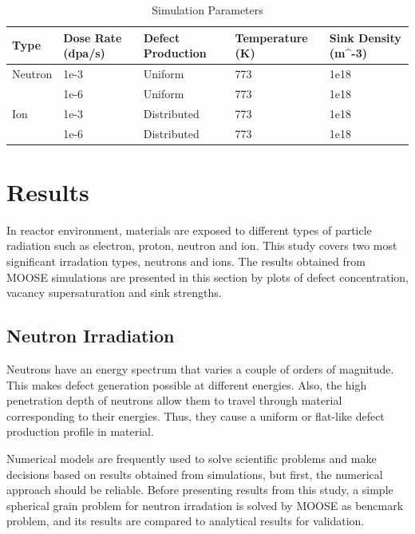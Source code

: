 \documentclass[a4paper]{article}
\begin{document}
\begin{table}[h!]
  \centering
  \caption{Simulation Parameters}
  \label{table:simulation_parameters}
  \begin{tabular}{ ||p{2cm}|p{3cm}|p{3cm}|p{3cm}|p{3cm}||  }
     \hline
     Type & Dose Rate (dpa/s) & Defect Production & Temperature (K) & Sink Density (m^{-3})\\
     \hline
     \hline
     Neutron  & 1e-3  & Uniform     & 773 & 1e18\\
              & 1e-6  & Uniform     & 773 & 1e18\\
     \hline
     Ion      & 1e-3  & Distributed & 773 & 1e18\\
              & 1e-6  & Distributed & 773 & 1e18\\
     \hline
  \end{tabular}
\end{table}

\newpage
\section{Results} \hspace{10pt}

In reactor environment, materials are exposed to different types of particle radiation such as electron, proton, neutron and ion. This study covers two most significant irradation types, neutrons and ions. The results obtained from MOOSE simulations are presented in this section by plots of defect concentration, vacancy supersaturation and sink strengths. %

  \subsection{Neutron Irradiation} \hspace{10pt}
  Neutrons have an energy spectrum that varies a couple of orders of magnitude. This makes defect generation possible at different energies. Also, the high penetration depth of neutrons allow them to travel through material corresponding to their energies. Thus, they cause a uniform or flat-like defect production profile in material.\cite{was2016}

  Numerical models are frequently used to solve scientific problems and make decisions based on results obtained from simulations, but first, the numerical approach should be reliable. Before presenting results from this study, a simple spherical grain problem for neutron irradation is solved by MOOSE as bencmark problem, and its results are compared to analytical results for validation.
\end{document}
